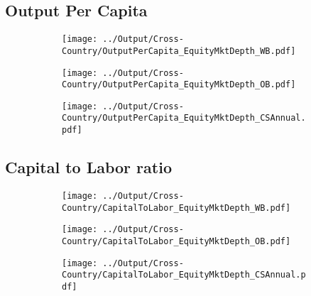 \documentclass[12pt,notitlepage]{article}
\begin{document}
\subsection{Output Per Capita}
\begin{figure}[!htpb]
\centering
\begin{subfigure}{.49\textwidth}
    \centering
 \texttt{[image: ../Output/Cross-Country/OutputPerCapita\_EquityMktDepth\_WB.pdf]}
\end{subfigure}
\begin{subfigure}{.49\textwidth}
    \centering
  \texttt{[image: ../Output/Cross-Country/OutputPerCapita\_EquityMktDepth\_OB.pdf]}
\end{subfigure}
\begin{subfigure}{.49\textwidth}
    \centering
  \texttt{[image: ../Output/Cross-Country/OutputPerCapita\_EquityMktDepth\_CSAnnual.pdf]}
\end{subfigure}
\end{figure}
\pagebreak

\subsection{Capital to Labor ratio}
\begin{figure}[!htpb]
\centering
\begin{subfigure}{.49\textwidth}
    \centering
 \texttt{[image: ../Output/Cross-Country/CapitalToLabor\_EquityMktDepth\_WB.pdf]}
\end{subfigure}
\begin{subfigure}{.49\textwidth}
    \centering
  \texttt{[image: ../Output/Cross-Country/CapitalToLabor\_EquityMktDepth\_OB.pdf]}
\end{subfigure}
\begin{subfigure}{.49\textwidth}
    \centering
  \texttt{[image: ../Output/Cross-Country/CapitalToLabor\_EquityMktDepth\_CSAnnual.pdf]}
\end{subfigure}
\end{figure}
\pagebreak
\end{document}
